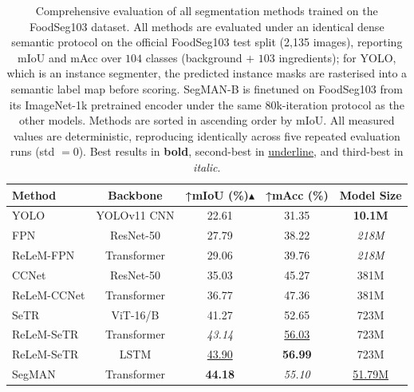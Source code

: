 \documentclass[preprint,12pt]{elsarticle}
\begin{document}
\begin{table}[htb]
\centering
\setlength{\tabcolsep}{2pt}
\caption{Comprehensive evaluation of all segmentation methods trained on the FoodSeg103 dataset. All methods are evaluated under an identical dense semantic protocol on the official FoodSeg103 test split (2{,}135 images), reporting mIoU and mAcc over $104$ classes (background $+$ $103$ ingredients); for YOLO, which is an instance segmenter, the predicted instance masks are rasterised into a semantic label map before scoring. SegMAN-B is finetuned on FoodSeg103 from its ImageNet-1k pretrained encoder under the same 80k-iteration protocol as the other models. Methods are sorted in ascending order by mIoU. All measured values are deterministic, reproducing identically across five repeated evaluation runs (std $=0$). Best results in \textbf{bold}, second-best in \uline{underline}, and third-best in \textit{italic}.}
\begin{tabular}{lcccc}
\toprule
\textbf{Method} & \textbf{Backbone} & \textbf{↑mIoU (\%)$\blacktriangle$} & \textbf{↑mAcc (\%)} &\textbf{ Model Size} \\
\midrule
YOLO & YOLOv11 CNN & 22.61 & 31.35 & \textbf{10.1M} \\
\rowcolor{gray!12}FPN & ResNet-50 & 27.79 & 38.22 & \textit{218M} \\
ReLeM-FPN & Transformer & 29.06 & 39.76 & \textit{218M} \\
\rowcolor{gray!12}CCNet & ResNet-50 & 35.03 & 45.27 & 381M \\
ReLeM-CCNet & Transformer & 36.77 & 47.36 & 381M \\
\rowcolor{gray!12}SeTR & ViT-16/B & 41.27 & 52.65 & 723M \\
ReLeM-SeTR & Transformer & \textit{43.14} & \uline{56.03} & 723M \\
\rowcolor{gray!12}ReLeM-SeTR & LSTM & \uline{43.90} & \textbf{56.99} & 723M \\
SegMAN & Transformer & \textbf{44.18} & \textit{55.10} & \uline{51.79M} \\

\bottomrule
\end{tabular}
\label{tab:model_comparisons}
\end{table}
\end{document}
